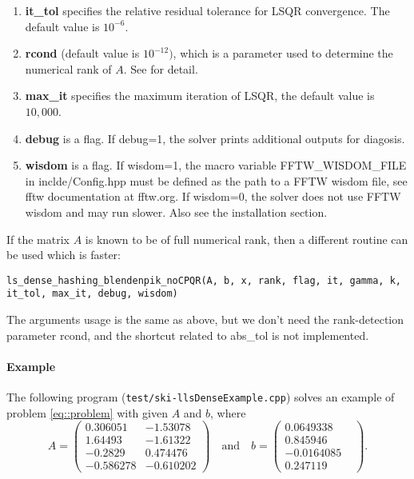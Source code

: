 \documentclass[english,11pt]{article}
\begin{document}
\begin{itemize}
\begin{enumerate}
			\item {\bf it_tol} specifies the relative residual tolerance for LSQR convergence. The default value is $10^{-6}$.
			
			\item {\bf rcond} (default value is $10^{-12})$, which is a parameter used to determine the numerical rank of $A$. See \cite{Zhen:OpOnline} for detail. 

			 \item {\bf max_it} specifies the maximum iteration of LSQR, the default value is $10,000$. 


			 \item {\bf debug} is a flag. If debug=1, the solver prints additional outputs for diagosis. 

			 \item {\bf wisdom} is a flag. If wisdom=1, the macro variable FFTW_WISDOM_FILE in inclde/Config.hpp must be defined as the path to a FFTW wisdom file, see fftw documentation at fftw.org. If wisdom=0, the solver does not use FFTW wisdom and may run slower. Also see the installation section.
		\end{enumerate}
		

	\end{itemize}


If the matrix $A$ is known to be of full numerical rank, then a different routine can be used which is faster:

{\tt ls_dense_hashing_blendenpik_noCPQR(A, b, x, rank, flag, it, gamma, k, it_tol, max_it, debug, wisdom)}

The arguments usage is the same as above, but we don't need the rank-detection parameter rcond, and the shortcut related to abs_tol is not implemented.

\paragraph{Example}

The following program ({\tt test/ski-llsDenseExample.cpp}) solves an example of problem \eqref{eq::problem} with given $A$ and $b$, where 
\begin{equation}
A = \begin{pmatrix}
0.306051 & -1.53078 \\
1.64493 & -1.61322 \\
-0.2829 & 0.474476	\\
-0.586278 & -0.610202 
\end{pmatrix} \quad \text{and} \quad 
b = \begin{pmatrix}
0.0649338 \\
0.845946 \\
-0.0164085\\
0.247119 & 
\end{pmatrix}.
\end{equation}
\end{document}
